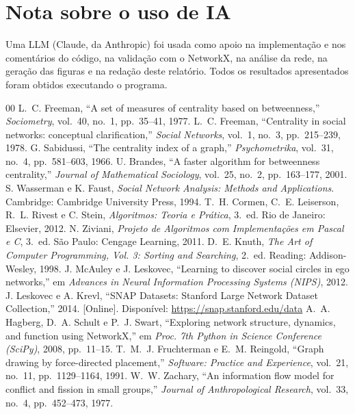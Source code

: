 \documentclass[conference]{IEEEtran}
\begin{document}
\section*{Nota sobre o uso de IA}

Uma LLM (Claude, da Anthropic) foi usada como apoio na implementação e nos comentários do código, na validação com o NetworkX, na análise da rede, na geração das figuras e na redação deste relatório. Todos os resultados apresentados foram obtidos executando o programa.

\begin{thebibliography}{00}
 L.~C. Freeman, ``A set of measures of centrality based on betweenness,'' \textit{Sociometry}, vol.~40, no.~1, pp.~35--41, 1977.
 L.~C. Freeman, ``Centrality in social networks: conceptual clarification,'' \textit{Social Networks}, vol.~1, no.~3, pp.~215--239, 1978.
 G. Sabidussi, ``The centrality index of a graph,'' \textit{Psychometrika}, vol.~31, no.~4, pp.~581--603, 1966.
 U. Brandes, ``A faster algorithm for betweenness centrality,'' \textit{Journal of Mathematical Sociology}, vol.~25, no.~2, pp.~163--177, 2001.
 S. Wasserman e K. Faust, \textit{Social Network Analysis: Methods and Applications}. Cambridge: Cambridge University Press, 1994.
 T.~H. Cormen, C.~E. Leiserson, R.~L. Rivest e C. Stein, \textit{Algoritmos: Teoria e Prática}, 3.~ed. Rio de Janeiro: Elsevier, 2012.
 N. Ziviani, \textit{Projeto de Algoritmos com Implementações em Pascal e C}, 3.~ed. São Paulo: Cengage Learning, 2011.
 D.~E. Knuth, \textit{The Art of Computer Programming, Vol. 3: Sorting and Searching}, 2.~ed. Reading: Addison-Wesley, 1998.
 J. McAuley e J. Leskovec, ``Learning to discover social circles in ego networks,'' em \textit{Advances in Neural Information Processing Systems (NIPS)}, 2012.
 J. Leskovec e A. Krevl, ``SNAP Datasets: Stanford Large Network Dataset Collection,'' 2014. [Online]. Disponível: \url{https://snap.stanford.edu/data}
 A.~A. Hagberg, D.~A. Schult e P.~J. Swart, ``Exploring network structure, dynamics, and function using NetworkX,'' em \textit{Proc. 7th Python in Science Conference (SciPy)}, 2008, pp.~11--15.
 T.~M.~J. Fruchterman e E.~M. Reingold, ``Graph drawing by force-directed placement,'' \textit{Software: Practice and Experience}, vol.~21, no.~11, pp.~1129--1164, 1991.
 W.~W. Zachary, ``An information flow model for conflict and fission in small groups,'' \textit{Journal of Anthropological Research}, vol.~33, no.~4, pp.~452--473, 1977.

\end{thebibliography}
\end{document}
